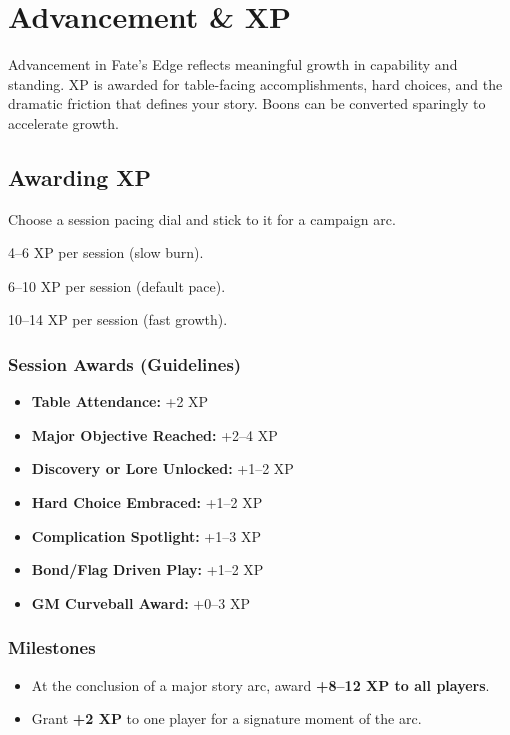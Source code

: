 

\section{Advancement \& XP}
\label{sec:advancement}

Advancement in Fate's Edge reflects meaningful growth in capability and standing. XP is awarded for table-facing accomplishments, hard choices, and the dramatic friction that defines your story. Boons can be converted sparingly to accelerate growth.

\subsection{Awarding XP}
Choose a session pacing dial and stick to it for a campaign arc.
\begin{description}[leftmargin=1.5em, style=nextline]
  \item[Gritty:] 4--6 XP per session (slow burn).
  \item[Standard:] 6--10 XP per session (default pace).
  \item[Heroic:] 10--14 XP per session (fast growth).
\end{description}

\subsubsection{Session Awards (Guidelines)}
\begin{itemize}
  \item \textbf{Table Attendance:} +2 XP
  \item \textbf{Major Objective Reached:} +2--4 XP
  \item \textbf{Discovery or Lore Unlocked:} +1--2 XP
  \item \textbf{Hard Choice Embraced:} +1--2 XP
  \item \textbf{Complication Spotlight:} +1--3 XP
  \item \textbf{Bond/Flag Driven Play:} +1--2 XP
  \item \textbf{GM Curveball Award:} +0--3 XP
\end{itemize}

\subsubsection{Milestones}
\begin{itemize}
  \item At the conclusion of a major story arc, award \textbf{+8--12 XP to all players}.
  \item Grant \textbf{+2 XP} to one player for a signature moment of the arc.
\end{itemize}

